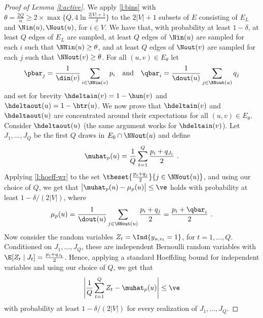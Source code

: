 \begin{proof}[Proof of Lemma \ref{l:active}]
We apply \autoref{l:bins} with $\theta = \tfrac{2Q}{\alpha} \ge 2\times\max\big\{Q,4\ln
\frac{2|V|+1}{\delta}\big\}$ to the $2|V|+1$ subsets of $E$ consisting of $E_L$ and
$\Nin(u),\Nout(u)$, for $i \in V$. We have that, with probability at least $1-\delta$, at least $Q$
edges of $E_L$ are sampled, at least $Q$ edges of $\Nin(u)$ are sampled for each $i$ such that
$\NNin(u) \ge \theta$, and at least $Q$ edges of $\Nout(v)$ are sampled for each $j$ such that
$\NNout(v) \ge \theta$.
For all $(u,v) \in E_{\theta}$ let
\[
  \pbar_j = \frac{1}{\din(v)}\sum_{i\in\NNin(v)} p_i \quad\text{and}\quad \qbar_i = \frac{1}{\dout(u)}\sum_{j\in\NNout(u)} q_j
\]
and set for brevity $\hdeltain(v) = 1-\hun(v)$ and $\hdeltaout(u) = 1-\htr(u)$.
We now prove that $\hdeltain(v)$ and $\hdeltaout(u)$ are concentrated around their expectations for
all $(u,v) \in E_{\theta}$. Consider $\hdeltaout(u)$ (the same argument works for $\hdeltain(v)$).
Let $J_1,\dots,J_Q$ be the first $Q$ draws in $E_0 \cap \NNout(u)$ and define
\[
  \muhat_p(u) = \frac{1}{Q} \sum_{t=1}^Q \frac{p_i+q_{J_t}}{2}~.
\]
Applying \autoref{l:hoeff-wr} to the set $\theset{\tfrac{p_i+q_j}{2}}{j \in \NNout(u)}$, and using
our choice of $Q$, we get that $\big|\muhat_p(u) - \mu_p(u)\big| \le \ve$ holds with probability at
least $1-\delta/(2|V|)$, where
\[
  \mu_p(u) = \frac{1}{\dout(u)}\sum_{j \in \NNout(u)} \frac{p_i + q_j}{2} = \frac{p_i + \qbar_i}{2}~.
\]
Now consider the random variables $Z_t = \Ind{y_{u,v_t}=1}$, for $t=1,\dots,Q$. Conditioned on
$J_1,\dots,J_Q$, these are independent Bernoulli random variables with $\E[Z_t \mid J_t] =
\tfrac{p_i+q_{J_t}}{2}$. Hence, applying a standard Hoeffding bound for independent variables and
using our choice of $Q$, we get that
\[
  \left|\frac{1}{Q}\sum_{t=1}^Q Z_t - \muhat_p(u) \right| \le \ve 
\]
with probability at least $1-\delta/(2|V|)$ for every realization of $J_1,\dots,J_Q$. 


\end{proof}
